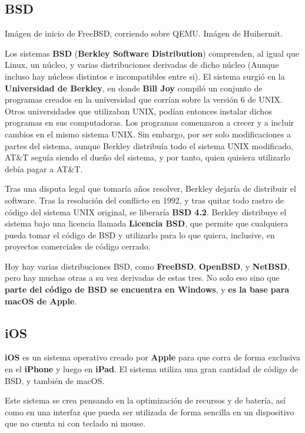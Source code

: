 \subsection*{BSD}

{Imágen de inicio de FreeBSD, corriendo sobre QEMU.} {Imágen de Huihermit.}

Los sistemas \textbf{BSD} (\textbf{Berkley Software Distribution}) comprenden,
al igual que Linux, un núcleo, y varias distribuciones derivadas de dicho núcleo
(Aunque incluso hay núcleos distintos e incompatibles entre si). El sistema
surgió en la \textbf{Universidad de Berkley}, en donde \textbf{Bill Joy} compiló
un conjunto de programas creados en la universidad que corrían sobre la versión
6 de UNIX. Otros universidades que utilizaban UNIX, podían entonces instalar
dichos programas en sus computadoras. Los programas comenzaron a crecer y a
incluir cambios en el mismo sistema UNIX. Sin embargo, por ser solo
modificaciones a partes del sistema, aunque Berkley distribuía todo el sistema
UNIX modificado, AT\&T seguía siendo el dueño del sistema, y por tanto, quien
quisiera utilizarlo debía pagar a AT\&T.

Tras una disputa legal que tomaría años resolver, Berkley dejaría de distribuir
el software. Tras la resolución del conflicto en 1992, y tras quitar todo rastro
de código del sistema UNIX original, se liberaría \textbf{BSD 4.2}. Berkley
distribuye el sistema bajo una licencia llamada \textbf{Licencia BSD}, que
permite que cualquiera pueda tomar el código de BSD y utilizarlo para lo que
quiera, inclusive, en proyectos comerciales de código cerrado.

Hoy hay varias distribuciones BSD, como \textbf{FreeBSD}, \textbf{OpenBSD}, y
\textbf{NetBSD}, pero hay muchas otras a su vez derivadas de estas tres. No solo
eso sino que \textbf{parte del código de BSD se encuentra en Windows}, y
\textbf{es la base para macOS de Apple}.

\subsection*{iOS}

\textbf{iOS} es un sistema operativo creado por \textbf{Apple} para que corra de
forma exclusiva en el \textbf{iPhone} y luego en \textbf{iPad}. El sistema
utiliza una gran cantidad de código de BSD, y también de macOS.

Este sistema se crea pensando en la optimización de recursos y de batería, así
como en una interfaz que pueda ser utilizada de forma sencilla en un dispositivo
que no cuenta ni con teclado ni mouse.

